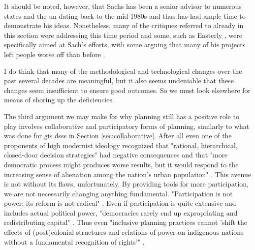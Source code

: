 It should be noted, however, that Sachs has been a senior advisor to numerous states and the \ac{un} dating back to the mid 1980s and thus has had ample time to demonstrate his ideas. Nonetheless, many of the critiques referred to already in this section were addressing this time period and some, such as Easterly \cite{easterlyWhiteManBurden2007a}, were specifically aimed at Sach's efforts, with some arguing that many of his projects left people worse off than before \cite{munkIdealistJeffreySachs2014}.

I do think that many of the methodological and technological changes over the past several decades are meaningful, but it also seems undeniable that these changes seem insufficient to ensure good outcomes. So we must look elsewhere for means of shoring up the deficiencies.

The third argument we may make for why planning still has a positive role to play involves collaborative and participatory forms of planning, similarly to what was done for \ac{gis} \acp{dss} in Section \ref{sec:collaborative}. After all even one of the proponents of high modernist ideology recognized that "rational, hierarchical, closed-door decision strategies" had negative consequences and that "more democratic process might produces worse results, but it would respond to the increasing sense of alienation among the nation's urban population" \cite{lightWarfareWelfareDefense2005}. This avenue is not without its flaws, unfortunately. By providing tools for more participation, we are not necessarily changing anything fundamental. "Participation is not power; its reform is not radical" \cite{marcuseThreeHistoricCurrents2016}. Even if participation is quite extensive and includes actual political power, "democracies rarely end up expropriating and redistributing capital" \cite{fainsteinSpatialJusticePlanning2016}. Thus even "inclusive planning practices cannot 'shift the effects of (post)colonial structures and relations of power on indigenous nations without a fundamental recognition of rights'" \cite{sandercockCommentaryIndigenousPlanning2004}.

